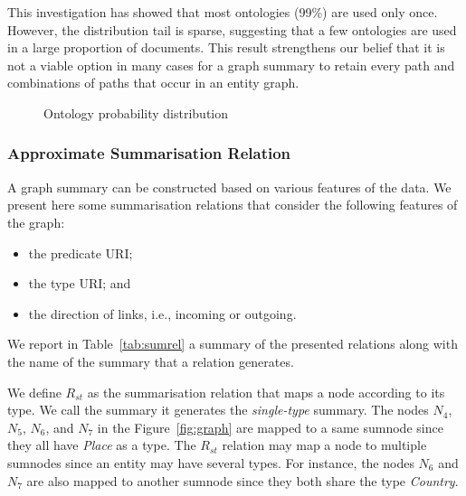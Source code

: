 This investigation has showed that most ontologies (99\%) are used only once. However, the distribution tail is sparse, suggesting that a few ontologies are used in a large proportion of documents.
This result strengthens our belief that it is not a viable option in many cases for a graph summary to retain every path and combinations of paths that occur in an entity graph.

\begin{figure}
	\centering
	
	\caption{Ontology probability distribution}
	\label{fig:onto-dist}
\end{figure}


\subsubsection{Approximate Summarisation Relation}

A graph summary can be constructed based on various features of the data. We present here some summarisation relations that consider the following features of the graph:
\begin{itemize}
	\item the predicate URI;
	\item the type URI; and
	\item the direction of links, i.e., incoming or outgoing.
\end{itemize}
We report in Table~\ref{tab:sumrel} a summary of the presented relations along with the name of the summary that a relation generates.


We define $R_{st}$ as the summarisation relation that maps a node according to its type. We call the summary it generates the \emph{single-type} summary.
The nodes $N_4$, $N_5$, $N_6$, and $N_7$ in the Figure~\ref{fig:graph} are mapped to a same sumnode since they all have \emph{Place} as a type. The $R_{st}$ relation may map a node to multiple sumnodes since an entity may have several types. For instance, the nodes $N_6$ and $N_7$ are also mapped to another sumnode since they both share the type \emph{Country}.

